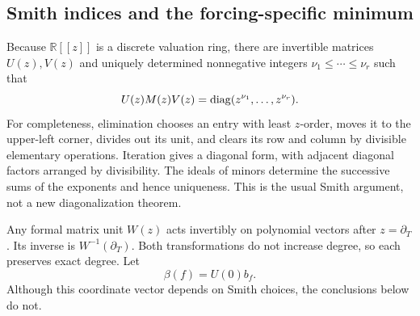 \documentclass[11pt,a4paper]{article}
\numberwithin{equation}{section}
\theoremstyle{definition}
\theoremstyle{remark}\newtheorem{remark}[theorem]{Remark}
\newcommand{\R}{\mathbb R}\newcommand{\C}{\mathbb C}
\newcommand{\dd}{\partial_T}\newcommand{\eps}{\varepsilon}
\begin{document}
\subsection{Smith indices and the forcing-specific minimum}
Because $\R[[z]]$ is a discrete valuation ring, there are invertible matrices $U(z),V(z)$ and uniquely determined nonnegative integers $\nu_1\le\cdots\le\nu_r$ such that
\begin{equation}
 U(z)M(z)V(z)=\operatorname{diag}(z^{\nu_1},\ldots,z^{\nu_r}).
 \label{eq:smith}
\end{equation}
For completeness, elimination chooses an entry with least $z$-order, moves it to the upper-left corner, divides out its unit, and clears its row and column by divisible elementary operations. Iteration gives a diagonal form, with adjacent diagonal factors arranged by divisibility. The ideals of minors determine the successive sums of the exponents and hence uniqueness. This is the usual Smith argument, not a new diagonalization theorem.

Any formal matrix unit $W(z)$ acts invertibly on polynomial vectors after $z=\dd$. Its inverse is $W^{-1}(\dd)$. Both transformations do not increase degree, so each preserves exact degree. Let
\begin{equation}
 \beta(f)=U(0)b_f.
 \label{eq:beta}
\end{equation}
Although this coordinate vector depends on Smith choices, the conclusions below do not.
\end{document}
